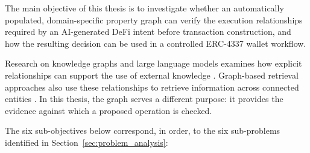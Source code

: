 The main objective of this thesis is to investigate whether an
automatically populated, domain-specific property graph can verify the
execution relationships required by an AI-generated DeFi intent before
transaction construction, and how the resulting decision can be used
in a controlled ERC-4337 wallet workflow.

Research on knowledge graphs and large language models examines how
explicit relationships can support the use of external knowledge
\cite{panUnifyingLargeLanguage2024}. Graph-based retrieval approaches
also use these relationships to retrieve information across connected
entities \cite{hanRetrievalAugmentedGenerationGraphs2025,
hanRAGVsGraphRAG2026}. In this thesis, the graph serves a different
purpose: it provides the evidence against which a proposed operation
is checked.

The six sub-objectives below correspond, in order, to the six
sub-problems identified in Section~\ref{sec:problem_analysis}:

